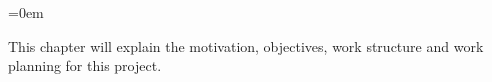 \parindent=0em

\addtocounter{section}{-4}

\noindent
This chapter will explain the motivation, objectives, work structure and work planning for this project.




